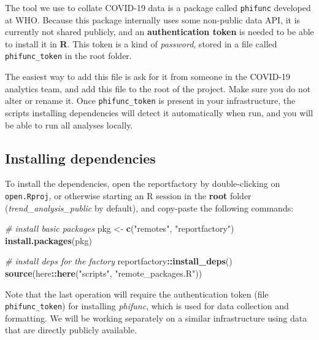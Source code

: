 \documentclass[]{book}
\newenvironment{Shaded}{\begin{snugshade}}{\end{snugshade}}
\newcommand{\CommentTok}[1]{\textcolor[rgb]{0.56,0.35,0.01}{\textit{#1}}}
\newcommand{\KeywordTok}[1]{\textcolor[rgb]{0.13,0.29,0.53}{\textbf{#1}}}
\newcommand{\NormalTok}[1]{#1}
\newcommand{\OperatorTok}[1]{\textcolor[rgb]{0.81,0.36,0.00}{\textbf{#1}}}
\newcommand{\StringTok}[1]{\textcolor[rgb]{0.31,0.60,0.02}{#1}}
\begin{document}
The tool we use to collate COVID-19 data is a package called \texttt{phifunc} developed
at WHO. Because this package internally uses some non-public data API, it is
currently not shared publicly, and an \textbf{authentication token} is needed to be
able to install it in \textbf{R}. This token is a kind of \emph{password}, stored in a
file called \texttt{phifunc\_token} in the root folder.

The easiest way to add this file is ask for it from someone in the COVID-19
analytics team, and add this file to the root of the project. Make sure you do
not alter or rename it. Once \texttt{phifunc\_token} is present in your infrastructure,
the scripts installing dependencies will detect it automatically when run, and
you will be able to run all analyses locally.

\hypertarget{installing-dependencies}{%
\subsection{Installing dependencies}\label{installing-dependencies}}

To install the dependencies, open the reportfactory by double-clicking on
\texttt{open.Rproj}, or otherwise starting an R session in the \textbf{root} folder
(\emph{trend\_analysis\_public} by default), and copy-paste the following commands:

\begin{Shaded}
\begin{Highlighting}[]

\CommentTok{# install basic packages}
\NormalTok{pkg <-}\StringTok{ }\KeywordTok{c}\NormalTok{(}\StringTok{"remotes"}\NormalTok{, }\StringTok{"reportfactory"}\NormalTok{)}
\KeywordTok{install.packages}\NormalTok{(pkg)}

\CommentTok{# install deps for the factory}
\NormalTok{reportfactory}\OperatorTok{::}\KeywordTok{install_deps}\NormalTok{()}
\KeywordTok{source}\NormalTok{(here}\OperatorTok{::}\KeywordTok{here}\NormalTok{(}\StringTok{"scripts"}\NormalTok{, }\StringTok{"remote_packages.R"}\NormalTok{))}
\end{Highlighting}
\end{Shaded}

Note that the last operation will require the authentication token (file
\texttt{phifunc\_token}) for installing \emph{phifunc}, which is used for data collection and
formatting. We will be working separately on a similar infrastructure using data
that are directly publicly available.
\end{document}
